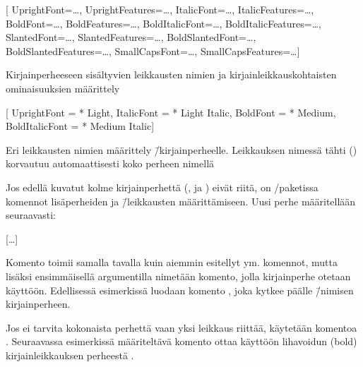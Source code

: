 \begin{esimerkki*}
\begin{koodilohko}
\setmainfont{…}[
  UprightFont={…},     UprightFeatures={…},
  ItalicFont={…},      ItalicFeatures={…},
  BoldFont={…},        BoldFeatures={…},
  BoldItalicFont={…},  BoldItalicFeatures={…},
  SlantedFont={…},     SlantedFeatures={…},
  BoldSlantedFont={…}, BoldSlantedFeatures={…},
  SmallCapsFont={…},   SmallCapsFeatures={…}]
\end{koodilohko}
  \caption{Kirjainperheeseen sisältyvien leikkausten nimien ja
    kirjainleikkauskohtaisten ominaisuuksien määrittely}
  \label{esim/fontit-leik-omin}
\end{esimerkki*}

\begin{esimerkki*}
\begin{koodilohko}
\setmainfont{Macklin Text}[
  UprightFont    = {* Light},
  ItalicFont     = {* Light Italic},
  BoldFont       = {* Medium},
  BoldItalicFont = {* Medium Italic}]
\end{koodilohko}
  \caption{Eri leikkausten nimien määrittely 
    \=/kirjainperheelle. Leikkauksen nimessä tähti (\koodi{*}) korvautuu
    automaattisesti koko perheen nimellä}
  \label{esim/fontit-leik-omin-käyt}
\end{esimerkki*}

Jos edellä kuvatut kolme kirjainperhettä (,
 ja ) eivät riitä, on
\-/paketissa komennot lisäperheiden ja \=/leikkausten
määrittämiseen. Uusi perhe määritellään seu\-raa\-vasti:

\begin{koodilohkosis}
[…]
\end{koodilohkosis}

\noindent
Komento  toimii samalla tavalla kuin aiemmin
esitellyt  ym. komennot, mutta lisäksi
ensimmäisellä argumentilla nimetään komento, jolla kirjainperhe otetaan
käyttöön. Edellisessä esimerkissä luodaan komento
, joka kytkee päälle 
\=/nimisen kirjainperheen.

Jos ei tarvita kokonaista perhettä vaan yksi leikkaus riittää, käytetään
komentoa . Seuraavassa esimerkissä määriteltävä
komento  ottaa käyttöön lihavoidun (bold)
kirjainleikkauksen perheestä .

